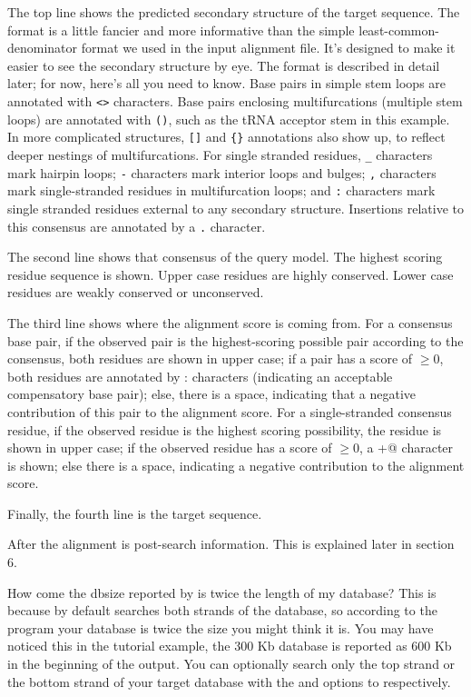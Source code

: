 The top line shows the predicted secondary structure of the target
sequence. The format is a little fancier and more informative than the
simple least-common-denominator format we used in the input alignment
file. It's designed to make it easier to see the
secondary structure by eye. The format is described in detail later;
for now, here's all you need to know. Base pairs in simple stem loops
are annotated with \verb+<>+ characters. Base pairs enclosing
multifurcations (multiple stem loops) are annotated with \verb+()+,
such as the tRNA acceptor stem in this example. In more complicated
structures, \verb+[]+ and \verb+{}+ annotations also show up, to
reflect deeper nestings of multifurcations. For single stranded
residues, \verb+_+ characters mark hairpin loops; \verb+-+ characters mark
interior loops and bulges; \verb+,+ characters mark single-stranded residues
in multifurcation loops; and \verb+:+ characters mark single stranded
residues external to any secondary structure. Insertions relative to
this consensus are annotated by a \verb+.+ character.

The second line shows that consensus of the query model. The highest
scoring residue sequence is shown. Upper case residues are highly
conserved. Lower case residues are weakly conserved or unconserved.

The third line shows where the alignment score is coming from. For a
consensus base pair, if the observed pair is the highest-scoring
possible pair according to the consensus, both residues are shown in
upper case; if a pair has a score of $\geq 0$, both residues are
annotated by : characters (indicating an acceptable compensatory base
pair); else, there is a space, indicating that a negative contribution
of this pair to the alignment score. For a single-stranded consensus
residue, if the observed residue is the highest scoring possibility,
the residue is shown in upper case; if the observed residue has a
score of $\geq 0$, a \verb@+@ character is shown; else there is a
space, indicating a negative contribution to the alignment score.

Finally, the fourth line is the target sequence.

After the alignment is post-search information. This is explained
later in section 6. 

\begin{srefaq}{How come the dbsize reported by  is
twice the length of my database?} This is because by default
   searches both strands of the database, so according
  to the program your database is twice the size you might think it
  is. You may have noticed this in the tutorial example, the 300 Kb
  database is reported as 600 Kb in the beginning of the
   output. You can optionally search only the top
  strand or the bottom strand of your target database with the
   and  options to 
  respectively. 
\end{srefaq}

